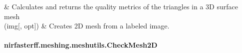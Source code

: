 \documentclass[letterpaper,10pt,english]{sphinxmanual}
\begin{document}
\begin{savenotes}
\begin{tabulary}{\linewidth}[t]{}
&
\sphinxAtStartPar
Calculates and returns the quality metrics of the triangles in a 3D surface mesh
\\
\sphinxhline
\sphinxAtStartPar
{\hyperref[\detokenize{_autosummary/nirfasterff.meshing.meshutils.img2mesh:nirfasterff.meshing.meshutils.img2mesh}]{}}(img{[}, opt{]})
&
\sphinxAtStartPar
Creates 2D mesh from a labeled image.
\\
\sphinxbottomrule
\end{tabulary}
\sphinxtableafterendhook\par
\sphinxattableend\end{savenotes}

\sphinxstepscope


\paragraph{nirfasterff.meshing.meshutils.CheckMesh2D}
\label{\detokenize{_autosummary/nirfasterff.meshing.meshutils.CheckMesh2D:nirfasterff-meshing-meshutils-checkmesh2d}}\label{\detokenize{_autosummary/nirfasterff.meshing.meshutils.CheckMesh2D::doc}}
\end{document}
